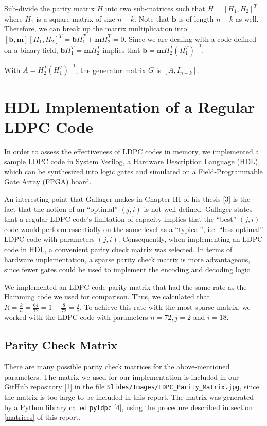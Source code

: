 \documentclass[conference]{IEEEtran}
\begin{document}
Sub-divide the parity matrix $H$ into two sub-matrices such that $H = [H_1, H_2]^T$ where $H_1$ is a square matrix of size $n-k$.
    Note that $\textbf{b}$ is of length $n-k$ as well.
    Therefore, we can break up the matrix
    multiplication into $[\textbf{b}, \textbf{m}][H_1, H_2]^T = \textbf{b}H_1^T + \textbf{m}H_2^T = 0$.
Since we are dealing with a code defined on a binary field, $\textbf{b}H_1^T = \textbf{m}H_2^T$ implies that $\textbf{b}= \textbf{m}H_2^T(H_1^T)^{-1}$.

    With $A = H_2^T(H_1^T)^{-1}$, the generator matrix $G$ is $[A, I_{n-k}]$.

\section{HDL Implementation of a Regular LDPC Code}
In order to assess the effectiveness of LDPC codes in memory, we implemented a sample LDPC code in System Verilog, a Hardware Description Language (HDL), which can be synthesized into logic gates and simulated on a Field-Programmable Gate Array (FPGA) board.

An interesting point that Gallager makes in Chapter III of his thesis [3] is the fact that the notion of an ``optimal'' $(j,i)$ is not well defined.
Gallager states that a regular LDPC code's limitation of capacity implies that the ``best'' $(j,i)$ code would perform essentially on the same level as a ``typical'', i.e. ``less optimal'' LDPC code with parameters $(j,i)$.
Consequently, when implementing an LDPC code in HDL, a convenient parity check matrix was selected.
In terms of hardware implementation, a sparse parity check matrix is more advantageous, since fewer gates could be used to implement the encoding and decoding logic.

We implemented an LDPC code parity matrix that had the same rate as 
the Hamming code we used for comparison.
Thus, we calculated that $R=\frac{k}{n}=\frac{64}{72}=1-\frac{8}{72} = \frac{j}{i}$.
To achieve this rate with the most sparse matrix, we worked with the LDPC code with parameters $n=72, j=2$ and $i=18$.

\subsection{Parity Check Matrix}
There are many possible parity check matrices for the above-mentioned parameters. The matrix we used for our implementation is included in our GitHub repository [1] in the file \verb+Slides/Images/LDPC_Parity_Matrix.jpg+,
since the matrix is too large to be included in this report. The matrix was generated by a Python library called \href{https://hichamjanati.github.io/pyldpc/}{\texttt{pyldpc}} [4], using the procedure described in section \ref{matrices} of this report.
\end{document}
